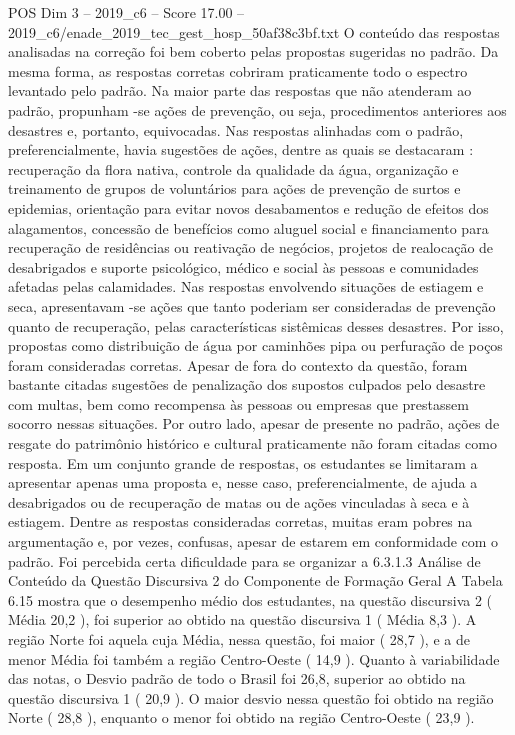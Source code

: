\begin{textsample}{POS Dim 3 – 2019\_c6 – Score 17.00 – 2019\_c6/enade\_2019\_tec\_gest\_hosp\_50af38c3bf.txt}
O conteúdo das respostas analisadas na correção foi bem coberto pelas propostas sugeridas no padrão.
Da mesma forma, as respostas corretas cobriram praticamente todo o espectro levantado pelo padrão.
Na maior parte das respostas que não atenderam ao padrão, propunham -se ações de prevenção, ou seja, procedimentos anteriores aos desastres e, portanto, equivocadas.
Nas respostas alinhadas com o padrão, preferencialmente, havia sugestões de ações, dentre as quais se destacaram : recuperação da flora nativa, controle da qualidade da água, organização e treinamento de grupos de voluntários para ações de prevenção de surtos e epidemias, orientação para evitar novos desabamentos e redução de efeitos dos alagamentos, concessão de benefícios como aluguel social e financiamento para recuperação de residências ou reativação de negócios, projetos de realocação de desabrigados e suporte psicológico, médico e social às pessoas e comunidades afetadas pelas calamidades.
Nas respostas envolvendo situações de estiagem e seca, apresentavam -se ações que tanto poderiam ser consideradas de prevenção quanto de recuperação, pelas características sistêmicas desses desastres.
Por isso, propostas como distribuição de água por caminhões pipa ou perfuração de poços foram consideradas corretas.
Apesar de fora do contexto da questão, foram bastante citadas sugestões de penalização dos supostos culpados pelo desastre com multas, bem como recompensa às pessoas ou empresas que prestassem socorro nessas situações.
Por outro lado, apesar de presente no padrão, ações de resgate do patrimônio histórico e cultural praticamente não foram citadas como resposta.
Em um conjunto grande de respostas, os estudantes se limitaram a apresentar apenas uma proposta e, nesse caso, preferencialmente, de ajuda a desabrigados ou de recuperação de matas ou de ações vinculadas à seca e à estiagem.
Dentre as respostas consideradas corretas, muitas eram pobres na argumentação e, por vezes, confusas, apesar de estarem em conformidade com o padrão.
Foi percebida certa dificuldade para se organizar a 6.3.1.3 Análise de Conteúdo da Questão Discursiva 2 do Componente de Formação Geral A Tabela 6.15 mostra que o desempenho médio dos estudantes, na questão discursiva 2 ( Média 20,2 ), foi superior ao obtido na questão discursiva 1 ( Média 8,3 ).
A região Norte foi aquela cuja Média, nessa questão, foi maior ( 28,7 ), e a de menor Média foi também a região Centro-Oeste ( 14,9 ).
Quanto à variabilidade das notas, o Desvio padrão de todo o Brasil foi 26,8, superior ao obtido na questão discursiva 1 ( 20,9 ).
O maior desvio nessa questão foi obtido na região Norte ( 28,8 ), enquanto o menor foi obtido na região Centro-Oeste ( 23,9 ).

\end{textsample}
